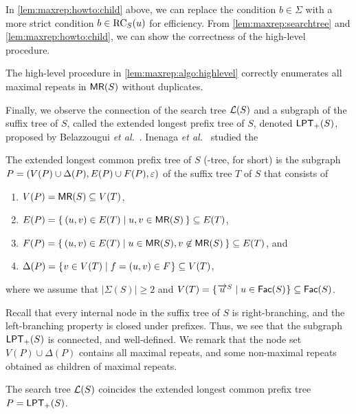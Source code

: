 In \cref{lem:maxrep:howto:child} above, we can replace the condition $b \in \Sigma$ with a more strict condition $b \in \mathrm{RC}_{S}(u)$ for efficiency.
From \cref{lem:maxrep:searchtree} and \cref{lem:maxrep:howto:child}, we can show the correctness of the high-level procedure. 

\begin{lemma}[correctness]\label{lem:maxrep:howto:child}
  The high-level procedure in \cref{lem:maxrep:algo:highlevel} correctly enumerates all maximal repeats in $\textsf{MR}(S)$ without duplicates. 
\end{lemma}

Finally, we observe the connection of the search tree $\mathcal{L}(S)$ and a subgraph of the suffix tree of $S$, called the extended longest prefix tree of $S$, denoted $\mathsf{LPT}_{+}(S)$, proposed by Belazzougui \textit{et al.}~\cite{belazzougui:nunial:gagie:prezza:raffinot2015composite}. Inenaga \textit{et al.}~\cite{inenaga:iwoca2024computing:maw} studied the 

\begin{definition}
The extended longest common prefix tree of $S$ (\LPTrm-tree, for short) is the subgraph $P = (V(P)\cup \Delta(P), E(P)\cup F(P), \varepsilon)$ of the suffix tree $T$ of $S$ that consists of 
\begin{enumerate}
\item $V(P) = \textsf{MR}(S) \subseteq V(T)$,  
\item $E(P) = \{\kern0.2em (u, v) \in E(T) \mid u, v \in \textsf{MR}(S) \kern0.2em\} \subseteq E(T)$,  
\item $F(P) = \{\kern0.2em (u, v) \in E(T) \mid u \in \textsf{MR}(S), v \not\in \textsf{MR}(S) \kern0.2em\} \subseteq E(T)$, and  
\item $\Delta(P) = \{\kern0.05em v \in V(T) \mid f = (u, v) \in F \kern0.05em\} \subseteq V(T)$,  
\end{enumerate}
where we assume that $|\Sigma(S)|\ge 2$ and $V(T) = \{\kern0.05em \overrightarrow{u}^{S} \mid u \in \mathsf{Fac}{(S)} \kern0.05em\} \subseteq \mathsf{Fac}{(S)}$. 
\end{definition}

Recall that every internal node in the suffix tree of $S$ is right-branching, and the left-branching property is closed under prefixes. Thus, we see that the subgraph $\mathsf{LPT}_{+}(S)$ is connected, and well-defined. 
We remark that the node set $V(P)\cup\Delta(P)$ contains all maximal repeats, and some non-maximal repeats obtained as children of maximal repeats.

\begin{lemma}\label{lem:lpt:character}
The search tree $\mathcal{L}(S)$ coincides the extended longest common prefix tree $P = \mathsf{LPT}_{+}(S)$. 
\end{lemma}

